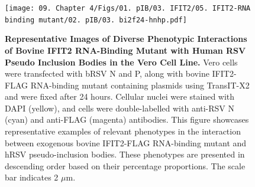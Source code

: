 \begin{figure}
    \centering
    \texttt{[image: 09. Chapter 4/Figs/01. pIB/03. IFIT2/05. IFIT2-RNA binding mutant/02. pIB/03. bi2f24-hnhp.pdf]}
    \caption[Representative Images of Diverse Phenotypic Interactions of Bovine IFIT2 RNA-Binding Mutant with Human RSV Pseudo Inclusion Bodies in the Vero Cell Line.]{\textbf{Representative Images of Diverse Phenotypic Interactions of Bovine IFIT2 RNA-Binding Mutant with Human RSV Pseudo Inclusion Bodies in the Vero Cell Line.}  Vero cells were transfected with bRSV N and P, along with bovine IFIT2-FLAG RNA-binding mutant containing plasmids using TransIT-X2 and were fixed after 24 hours. Cellular nuclei were stained with DAPI (yellow), and cells were double-labelled with anti-RSV N (cyan) and anti-FLAG (magenta) antibodies. This figure showcases representative examples of relevant phenotypes in the interaction between exogenous bovine IFIT2-FLAG RNA-binding mutant and hRSV pseudo-inclusion bodies. These phenotypes are presented in descending order based on their percentage proportions. The scale bar indicates 2 \(\mu \mbox{m}\).}
    \label{fig:Representative Images of Diverse Phenotypic Interactions of Bovine IFIT2 RNA-Binding Mutant with Human RSV Pseudo Inclusion Bodies in the Vero Cell Line}
\end{figure}

